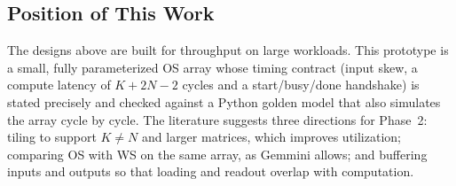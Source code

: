 \subsection{Position of This Work}
The designs above are built for throughput on large workloads. This prototype is a small, fully parameterized OS array whose timing contract (input skew, a compute latency of $K + 2N - 2$ cycles and a start/busy/done handshake) is stated precisely and checked against a Python golden model that also simulates the array cycle by cycle. The literature suggests three directions for Phase~2: tiling to support $K \neq N$ and larger matrices, which improves utilization; comparing OS with WS on the same array, as Gemmini allows; and buffering inputs and outputs so that loading and readout overlap with computation.

